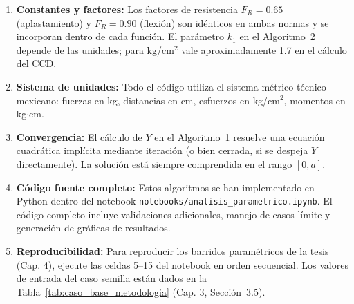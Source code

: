 \begin{enumerate}
  \item \textbf{Constantes y factores:} Los factores de resistencia $F_R = 0.65$ (aplastamiento)
    y $F_R = 0.90$ (flexión) son idénticos en ambas normas y se incorporan dentro de cada
    función. El parámetro $k_1$ en el Algoritmo~2 depende de las unidades; para kg/cm$^2$
    vale aproximadamente 1.7 en el cálculo del CCD.

  \item \textbf{Sistema de unidades:} Todo el código utiliza el sistema métrico técnico
    mexicano: fuerzas en kg, distancias en cm, esfuerzos en kg/cm$^2$, momentos en kg$\cdot$cm.

  \item \textbf{Convergencia:} El cálculo de $Y$ en el Algoritmo~1 resuelve una ecuación
    cuadrática implícita mediante iteración (o bien cerrada, si se despeja $Y$ directamente).
    La solución está siempre comprendida en el rango $[0, a]$.

  \item \textbf{Código fuente completo:} Estos algoritmos se han implementado en Python
    dentro del notebook \texttt{notebooks/analisis\_parametrico.ipynb}. El código completo
    incluye validaciones adicionales, manejo de casos límite y generación de gráficas de
    resultados.

  \item \textbf{Reproducibilidad:} Para reproducir los barridos paramétricos de la tesis
    (Cap. 4), ejecute las celdas 5--15 del notebook en orden secuencial. Los valores
    de entrada del caso semilla están dados en la Tabla~\ref{tab:caso_base_metodologia}
    (Cap. 3, Sección~3.5).
\end{enumerate}
